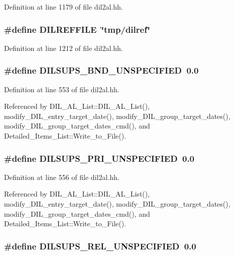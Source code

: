 Definition at line 1179 of file dil2al.hh.
\subsubsection{\setlength{\rightskip}{0pt plus 5cm}\#define DILREFFILE\ \char`\"{}tmp/{\bf dilref}\char`\"{}}\label{dil2al_8hh_a65}




Definition at line 1212 of file dil2al.hh.
\subsubsection{\setlength{\rightskip}{0pt plus 5cm}\#define DILSUPS\_\-BND\_\-UNSPECIFIED\ 0.0}\label{dil2al_8hh_a25}




Definition at line 553 of file dil2al.hh.

Referenced by DIL\_\-AL\_\-List::DIL\_\-AL\_\-List(), modify\_\-DIL\_\-entry\_\-target\_\-date(), modify\_\-DIL\_\-group\_\-target\_\-dates(), modify\_\-DIL\_\-group\_\-target\_\-dates\_\-cmd(), and Detailed\_\-Items\_\-List::Write\_\-to\_\-File().
\subsubsection{\setlength{\rightskip}{0pt plus 5cm}\#define DILSUPS\_\-PRI\_\-UNSPECIFIED\ 0.0}\label{dil2al_8hh_a28}




Definition at line 556 of file dil2al.hh.

Referenced by DIL\_\-AL\_\-List::DIL\_\-AL\_\-List(), modify\_\-DIL\_\-entry\_\-target\_\-date(), modify\_\-DIL\_\-group\_\-target\_\-dates(), modify\_\-DIL\_\-group\_\-target\_\-dates\_\-cmd(), and Detailed\_\-Items\_\-List::Write\_\-to\_\-File().
\subsubsection{\setlength{\rightskip}{0pt plus 5cm}\#define DILSUPS\_\-REL\_\-UNSPECIFIED\ 0.0}\label{dil2al_8hh_a23}




